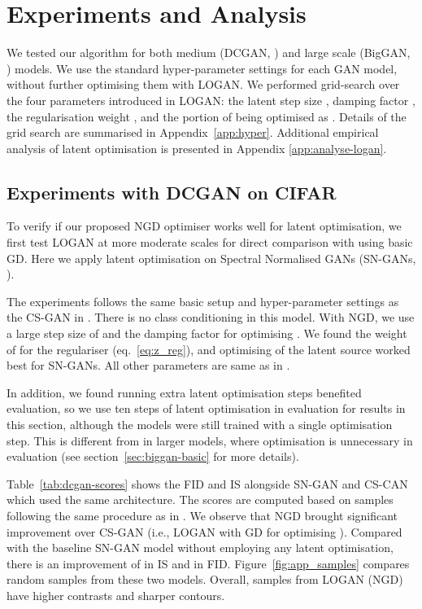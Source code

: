 \documentclass{article} \usepackage{iclr2020_conference,times}
\begin{document}
\section{Experiments and Analysis}
\label{sec:experiments}

We tested our algorithm for both medium (DCGAN, \citealt{radford2015unsupervised,miyato2018spectral}) and large scale (BigGAN, \citealt{brock2018large}) models. We use the standard hyper-parameter settings for each GAN model, without further optimising them with LOGAN. We performed grid-search over the four parameters introduced in LOGAN: the latent step size , damping factor , the regularisation weight , and the portion of  being optimised as . Details of the grid search are summarised in Appendix~\ref{app:hyper}. Additional empirical analysis of latent optimisation is presented in Appendix \ref{app:analyse-logan}.

\subsection{Experiments with DCGAN on CIFAR}
\label{app:dcgan}

To verify if our proposed NGD optimiser works well for latent optimisation, we first test LOGAN at more moderate scales for direct comparison with \citet{wu2019deep} using basic GD. Here we apply latent optimisation on Spectral Normalised GANs (SN-GANs, \citealt{miyato2018spectral}). 

The experiments follows the same basic setup and hyper-parameter settings as the CS-GAN in \cite{wu2019deep}. There is no class conditioning in this model. With NGD, we use a large step size of  and the damping factor  for optimising . We found the weight of  for the regulariser  (eq.~\ref{eq:z_reg}), and optimising  of the latent source worked best for SN-GANs. All other parameters are same as in \citealt{wu2019deep}.

In addition, we found running extra latent optimisation steps benefited evaluation, so we use ten steps of latent optimisation in evaluation for results in this section, although the models were still trained with a single optimisation step. This is different from in larger models, where optimisation is unnecessary in evaluation (see section~\ref{sec:biggan-basic} for more details).

Table~\ref{tab:dcgan-scores} shows the FID and IS alongside SN-GAN and CS-CAN which used the same architecture. The scores are computed based on  samples following the same procedure as in \citet{wu2019deep}. We observe that NGD brought significant improvement over CS-GAN (i.e., LOGAN with GD for optimising ). Compared with the baseline SN-GAN model without employing any latent optimisation, there is an improvement of  in IS and  in FID.
Figure~\ref{fig:app_samples} compares random samples from these two models. Overall, samples from LOGAN (NGD) have higher contrasts and sharper contours.
\end{document}
